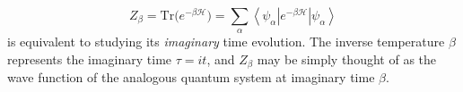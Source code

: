 \begin{equation}\label{eq:partitionBeta}
Z_\beta = \text{Tr} \big( e^{-\beta \mathcal{H} } \big) = \sum_{\alpha} \left\langle \psi_\alpha | e^{-\beta \mathcal{H} } | \psi_\alpha \right\rangle
\end{equation}
is equivalent to studying its \emph{imaginary} time evolution.
The inverse temperature $\beta$ represents the imaginary time $\tau = it$, and $Z_\beta$ may be simply thought of as the wave function of the analogous quantum system at imaginary time $\beta$.
%
%
%
%
%
%
%
